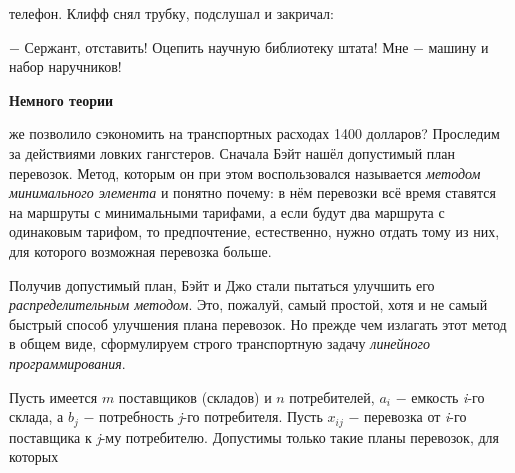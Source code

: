 \begin{minipage}[ht]{0.45\linewidth}
 телефон. Клифф снял трубку, подслушал и закричал:

$-$ Сержант, отставить! Оцепить научную библиотеку штата! Мне $-$ машину и набор наручников!

\bigskip

\noindent\textbf{Немного теории}

\medskip

 же позволило сэкономить на транспортных расходах 1400 долларов? Проследим за действиями ловких гангстеров. Сначала Бэйт нашёл допустимый план перевозок. Метод, которым он при этом воспользовался называется \hspace{2mm} \textit{методом минимального элемента} \hspace{2mm} и понятно почему: в нём перевозки всё время ставятся на маршруты с минимальными тарифами, а если будут два маршрута с одинаковым тарифом, то предпочтение, естественно, нужно отдать тому из них, для которого возможная перевозка больше.

Получив допустимый план, Бэйт и Джо стали пытаться улучшить его \textit{распределительным методом}. Это, пожалуй, самый простой, хотя и не самый быстрый способ улучшения плана перевозок. Но прежде чем излагать этот метод в общем виде, сформулируем строго транспортную задачу \textit{линейного программирования}.

Пусть имеется $m$ поставщиков (складов) и $n$ потребителей, $a_i$ \hspace{1mm}$-$ емкость \textit{i}-го склада, а $b_j$ \hspace{1mm}$-$ потребность \textit{j}-го потребителя. Пусть $x_{i j}$ \hspace{1mm}$-$ перевозка от \textit{i}-го поставщика к \textit{j}-му потребителю. Допустимы только такие планы перевозок, для которых
\end{minipage}